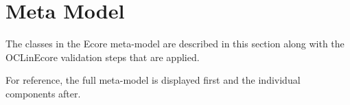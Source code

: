 \section{Meta Model}
The classes in the Ecore meta-model are described in this section along
with the OCLinEcore validation steps that are applied.

For reference, the full meta-model is displayed first and the individual
components after.